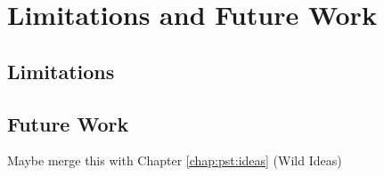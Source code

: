 
\chapter[Limitations and Future Work]{Limitations and Future Work}\label{chap:limitations_future_work}


\section{Limitations}


\section{Future Work}

Maybe merge this with Chapter \ref{chap:pst:ideas} (Wild Ideas)

